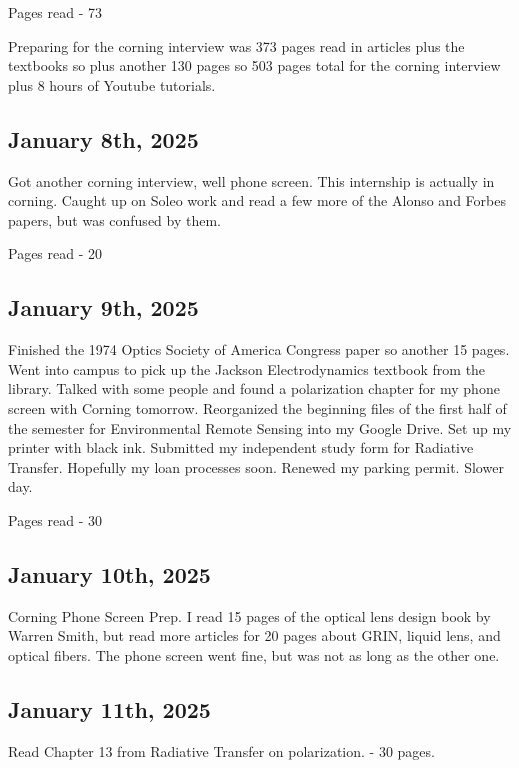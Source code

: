 \documentclass{article}
\begin{document}
Pages read - 73 %

Preparing for the corning interview was 373 pages read in articles plus the textbooks so plus another 130 pages so 503 pages total for the corning interview plus 8 hours of Youtube tutorials. 


\subsection{January 8th, 2025}
Got another corning interview, well phone screen. This internship is actually in corning. Caught up on Soleo work and read a few more of the Alonso and Forbes papers, but was confused by them. 

Pages read - 20

\subsection{January 9th, 2025}
Finished the 1974 Optics Society of America Congress paper so another 15 pages. 
Went into campus to pick up the Jackson Electrodynamics textbook from the library. Talked with some people and found a polarization chapter for my phone screen with Corning tomorrow. Reorganized the beginning files of the first half of the semester for Environmental Remote Sensing into my Google Drive. Set up my printer with black ink. Submitted my independent study form for Radiative Transfer. Hopefully my loan processes soon. Renewed my parking permit. Slower day. 

Pages read - 30

\subsection{January 10th, 2025}
Corning Phone Screen Prep. I read 15 pages of the optical lens design book by Warren Smith, but read more articles for 20 pages about GRIN, liquid lens, and optical fibers. The phone screen went fine, but was not as long as the other one. %


\subsection{January 11th, 2025}
Read Chapter 13 from Radiative Transfer on polarization. - 30 pages. 
\end{document}
